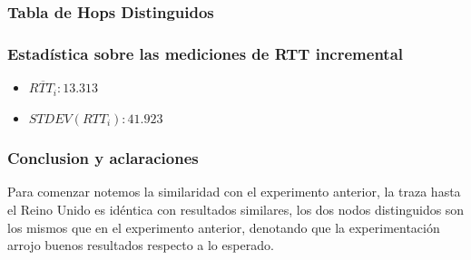 \subsubsection{Tabla de Hops Distinguidos}
\begin{center}
\end{center}

\subsubsection{Estadística sobre las mediciones de RTT incremental}
\begin{itemize}
	\item $\overline{RTT_i}: 13.313$
	\item $STDEV(RTT_i): 41.923$
\end{itemize}

\subsubsection{Conclusion y aclaraciones}
Para comenzar notemos la similaridad con el experimento anterior, la traza hasta el Reino Unido es idéntica con resultados similares, los dos nodos distinguidos son los mismos que en el experimento anterior, denotando que la experimentación arrojo buenos resultados respecto a lo esperado. 
